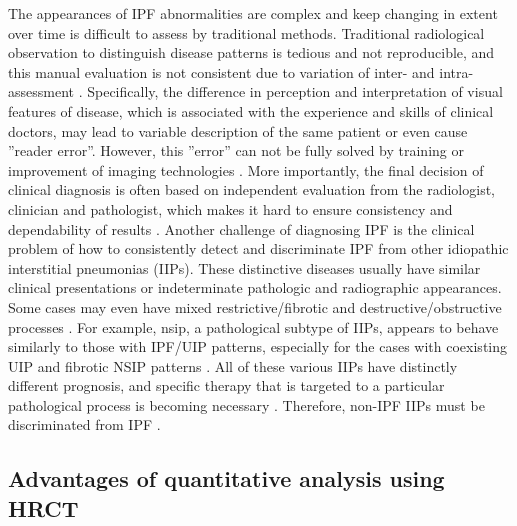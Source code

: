 The appearances of IPF abnormalities are complex and keep changing in extent over time is difficult to assess by traditional methods. Traditional radiological observation to distinguish disease patterns is tedious and not reproducible, and this manual evaluation is not consistent due to variation of inter- and intra-assessment \citep{flaherty2007idiopathic, watadani2013interobserver}. Specifically, the difference in perception and interpretation of visual features of disease, which is associated with the experience and skills of clinical doctors, may lead to variable description of the same patient or even cause ''reader error''. However, this ''error'' can not be fully solved by training or improvement of imaging technologies \citep{kundel2006history,bartholmai2013quantitative}. More importantly, the final decision of clinical diagnosis is often based on independent evaluation from the radiologist, clinician and pathologist, which makes it hard to ensure consistency and dependability of results  \citep{flaherty2004idiopathic,sverzellati2011method}. Another challenge of diagnosing IPF is the clinical problem of how to consistently detect and discriminate IPF from other idiopathic interstitial pneumonias (IIPs). These distinctive diseases usually have similar clinical presentations or indeterminate pathologic and radiographic appearances. Some cases may even have mixed restrictive/fibrotic and destructive/obstructive processes \citep{bartholmai2013quantitative}. For example, \gls{nsip}, a pathological subtype of IIPs, appears to behave similarly to those with IPF/UIP patterns, especially for the cases with coexisting UIP and fibrotic NSIP patterns \citep{monaghan2004prognostic, flaherty2001histopathologic}. All of these various IIPs have distinctly different prognosis, and specific therapy that is targeted to a particular pathological process is becoming necessary \citep{lynch2005high}. Therefore, non-IPF IIPs must be discriminated from IPF \citep{bjoraker1998prognostic}. 

\subsection{Advantages of quantitative analysis using HRCT} \label{Advantages}

